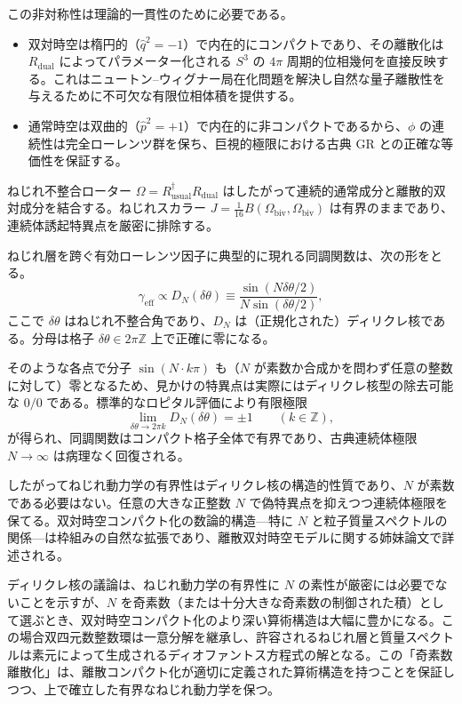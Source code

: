 \documentclass[dvipdfmx,a4paper]{article}
\begin{document}
この非対称性は理論的一貫性のために必要である。
\begin{itemize}
  \item 双対時空は楕円的（$\hat{q}^2 = -1$）で内在的にコンパクトであり、その離散化は $R_{\text{dual}}$ によってパラメーター化される $S^3$ の $4\pi$ 周期的位相幾何を直接反映する。これはニュートン--ウィグナー局在化問題を解決し自然な量子離散性を与えるために不可欠な有限位相体積を提供する。
  \item 通常時空は双曲的（$\hat{p}^2 = +1$）で内在的に非コンパクトであるから、$\phi$ の連続性は完全ローレンツ群を保ち、巨視的極限における古典 GR との正確な等価性を保証する。
\end{itemize}

ねじれ不整合ローター $\Omega = R_{\text{usual}}^\dagger R_{\text{dual}}$ はしたがって連続的通常成分と離散的双対成分を結合する。ねじれスカラー $J = \frac{1}{16} B(\Omega_{\text{biv}}, \Omega_{\text{biv}})$ は有界のままであり、連続体誘起特異点を厳密に排除する。

ねじれ層を跨ぐ有効ローレンツ因子に典型的に現れる同調関数は、次の形をとる。
\[
\gamma_{\text{eff}} \propto D_N(\delta\theta) \equiv \frac{\sin(N \delta\theta / 2)}{N \sin(\delta\theta / 2)},
\]
ここで $\delta\theta$ はねじれ不整合角であり、$D_N$ は（正規化された）ディリクレ核である。分母は格子 $\delta\theta \in 2\pi \mathbb{Z}$ 上で正確に零になる。

そのような各点で分子 $\sin(N \cdot k\pi)$ も（$N$ が素数か合成かを問わず任意の整数に対して）零となるため、見かけの特異点は実際にはディリクレ核型の除去可能な $0/0$ である。標準的なロピタル評価により有限極限
\[
\lim_{\delta\theta \to 2\pi k} D_N(\delta\theta) = \pm 1 \qquad (k \in \mathbb{Z}),
\]
が得られ、同調関数はコンパクト格子全体で有界であり、古典連続体極限 $N \to \infty$ は病理なく回復される。

したがってねじれ動力学の有界性はディリクレ核の構造的性質であり、$N$ が素数である必要はない。任意の大きな正整数 $N$ で偽特異点を抑えつつ連続体極限を保てる。双対時空コンパクト化の数論的構造---特に $N$ と粒子質量スペクトルの関係---は枠組みの自然な拡張であり、離散双対時空モデルに関する姉妹論文で詳述される。

ディリクレ核の議論は、ねじれ動力学の有界性に $N$ の素性が厳密には必要でないことを示すが、$N$ を奇素数（または十分大きな奇素数の制御された積）として選ぶとき、双対時空コンパクト化のより深い算術構造は大幅に豊かになる。この場合双四元数整数環は一意分解を継承し、許容されるねじれ層と質量スペクトルは素元によって生成されるディオファントス方程式の解となる。この「奇素数離散化」は、離散コンパクト化が適切に定義された算術構造を持つことを保証しつつ、上で確立した有界なねじれ動力学を保つ。
\end{document}
